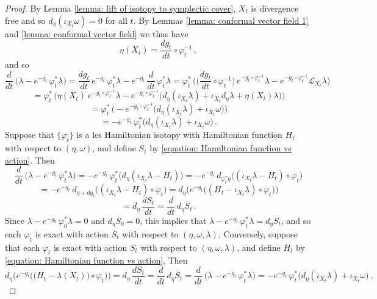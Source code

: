 \documentclass{amsart}
\theoremstyle{remark}
\begin{document}
\begin{proof}
By Lemma \ref{lemma: lift of isotopy to symplectic cover},
$X_t$ is divergence free
and so $d_{\eta} (\iota_{X_t}\omega) = 0$ for all $t$.
By Lemmas \ref{lemma: conformal vector field 1}
and \ref{lemma: conformal vector field}
we thus have
$$
\eta (X_t) = \frac{dg_t}{dt} \circ \varphi_t^{-1} \,,
$$
and so
\[
\frac{d}{dt} \, \big(\lambda - e^{-g_t} \, \varphi_t^{\ast}\lambda \big)
= \frac{dg_t}{dt} \, e^{-g_t} \, \varphi_t^{\ast}\lambda - e^{-g_t} \, \frac{d}{dt} \, \varphi_t^{\ast}\lambda
= \varphi_t^{\ast} \, \Big( \Big(\frac{dg_t}{dt} \circ \varphi_t^{-1}\Big) \,
e^{-g_t \circ \varphi_t^{-1}} \lambda
- e^{-g_t \circ \varphi_t^{-1}} \mathcal{L}_{X_t}\lambda \Big)
\]
\[
= \varphi_t^{\ast} \, \Big( \eta (X_t) \, e^{-g_t \circ \varphi_t^{-1}} \lambda
- e^{-g_t \circ \varphi_t^{-1}}
\big( d_{\eta} (\iota_{X_t}\lambda) + \iota_{X_t}d_{\eta}\lambda + \eta(X_t) \lambda \big) \Big)
\]
\[
= \varphi_t^{\ast} \, \Big( - e^{-g_t \circ \varphi_t^{-1}}
\big( d_{\eta} (\iota_{X_t}\lambda) + \iota_{X_t}\omega \big) \Big)
\]
\[
= - e^{-g_t} \,
\varphi_t^{\ast} \big( d_{\eta} (\iota_{X_t}\lambda) + \iota_{X_t}\omega \big) \,.
\]
Suppose that $\{\varphi_t\}$ is a lcs Hamiltonian isotopy
with Hamiltonian function $H_t$ with respect to $(\eta, \omega)$,
and define $S_t$ by \eqref{equation: Hamiltonian function vs action}.
Then
\[
\frac{d}{dt} \, \big(\lambda - e^{-g_t} \, \varphi_t^{\ast}\lambda \big)
= - e^{-g_t} \, \varphi_t^{\ast} \big( d_{\eta} (\iota_{X_t}\lambda - H_t) \big)
= - e^{-g_t} \, d_{\varphi_t^{\ast}\eta} \big((\iota_{X_t}\lambda - H_t) \circ \varphi_t \big)
\]
\[
= - e^{-g_t} \, d_{\eta + dg_t} \big((\iota_{X_t}\lambda - H_t) \circ \varphi_t \big)
= d_{\eta} \Big( e^{-g_t} \big((H_t - \iota_{X_t}\lambda) \circ \varphi_t \big) \Big)
\]
\[
= d_{\eta} \, \frac{dS_t}{dt}
= \frac{d}{dt} \, d_{\eta}S_t \,.
\]
Since $\lambda - e^{-g_0} \, \varphi_0^{\ast}\lambda = 0$
and $d_{\eta}S_0 = 0$,
this implies that
$\lambda - e^{-g_t} \, \varphi_t^{\ast}\lambda = d_{\eta}S_t$,
and so each $\varphi_t$ is exact with action $S_t$
with respect to $(\eta, \omega, \lambda)$.
Conversely,
suppose that each $\varphi_t$ is exact with action $S_t$
with respect to $(\eta, \omega, \lambda)$,
and define $H_t$ by \eqref{equation: Hamiltonian function vs action}.
Then
\[
d_{\eta} \Big( e^{-g_t} \big( \big(H_t - \lambda (X_t)\big) \circ \varphi_t \big) \Big)
= d_{\eta} \, \frac{dS_t}{dt}
= \frac{d}{dt} \, d_{\eta}S_t
= \frac{d}{dt} \, \big(\lambda - e^{-g_t} \, \varphi_t^{\ast}\lambda \big)
= - e^{-g_t} \,
\varphi_t^{\ast} \big( d_{\eta} (\iota_{X_t}\lambda) + \iota_{X_t}\omega \big) \,,
\]
\end{proof}
\end{document}
